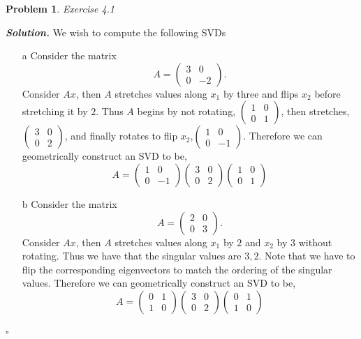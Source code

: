\documentclass[12pt]{report}
\newtheorem{problem}{Problem}
\newenvironment{solution}[1][\it{Solution}]{\textbf{#1. } }{$\square$}
\begin{document}
\newpage



\begin{problem}
    Exercise 4.1
\end{problem}

\begin{solution}
    \noindent
    We wish to compute the following SVDs
    \begin{enumerate}
        \item [a] Consider the matrix $$A = \begin{pmatrix} 3&0\\0&-2\end{pmatrix}.$$ Consider $Ax$, then $A$ stretches values along $x_1$ by three and flips $x_2$ before stretching it by $2$. Thus $A$ begins by not rotating, $\begin{pmatrix} 1&0\\0&1\end{pmatrix}$, then stretches, $\begin{pmatrix} 3&0\\0&2\end{pmatrix}$, and finally rotates to flip $x_2$,$\begin{pmatrix} 1&0\\0&-1\end{pmatrix}$. Therefore we can geometrically construct an SVD to be, $$A = \begin{pmatrix} 1&0\\0&-1\end{pmatrix}\begin{pmatrix} 3&0\\0&2\end{pmatrix}\begin{pmatrix} 1&0\\0&1\end{pmatrix}$$
        
        \item [b] Consider the matrix $$A = \begin{pmatrix} 2&0\\0&3 \end{pmatrix}.$$ Consider $Ax$, then $A$ stretches values along $x_1$ by $2$ and $x_2$ by $3$ without rotating. Thus we have that the singular values are $3,2$. Note that we have to flip the corresponding eigenvectors to match the ordering of the singular values. Therefore we can geometrically construct an SVD to be, $$A = \begin{pmatrix} 0&1\\1&0\end{pmatrix}\begin{pmatrix} 3&0\\0&2\end{pmatrix}\begin{pmatrix} 0&1\\1&0\end{pmatrix}$$
        

\end{enumerate}
\end{solution}
\end{document}
